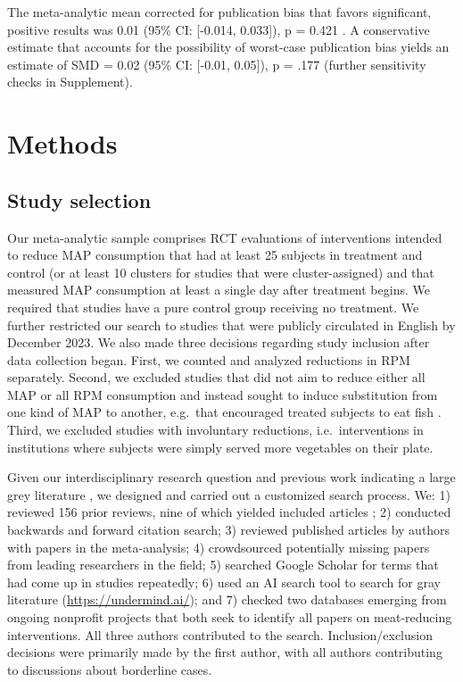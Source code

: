 \documentclass[sn-nature,referee,pdflatex]{sn-jnl}
\begin{document}
The meta-analytic mean corrected for publication bias that favors
significant, positive results was 0.01 (95\% CI: {[}-0.014, 0.033{]}), p
= 0.421 \citep{hedges1992}. A conservative estimate that accounts for
the possibility of worst-case publication bias yields an estimate of SMD
= 0.02 (95\% CI: {[}-0.01, 0.05{]}), p = .177
\citep{mathur2020, mathur2024} (further sensitivity checks in
Supplement).

\section{Methods}\label{sec3}

\subsection{Study selection}\label{sec3.1}

Our meta-analytic sample comprises RCT evaluations of interventions
intended to reduce MAP consumption that had at least 25 subjects in
treatment and control (or at least 10 clusters for studies that were
cluster-assigned) and that measured MAP consumption at least a single
day after treatment begins. We required that studies have a pure control
group receiving no treatment. We further restricted our search to
studies that were publicly circulated in English by December 2023. We
also made three decisions regarding study inclusion after data
collection began. First, we counted and analyzed reductions in RPM
separately. Second, we excluded studies that did not aim to reduce
either all MAP or all RPM consumption and instead sought to induce
substitution from one kind of MAP to another, e.g.~that encouraged
treated subjects to eat fish \citep{johansen2009}. Third, we excluded
studies with involuntary reductions, i.e.~interventions in institutions
where subjects were simply served more vegetables on their plate.

Given our interdisciplinary research question and previous work
indicating a large grey literature \citep{mathur2021meta}, we designed
and carried out a customized search process. We: 1) reviewed 156 prior
reviews, nine of which yielded included articles
\citep{mathur2021meta, bianchi2018conscious, bianchi2018restructuring, ammann2023, chang2023, DiGennaro2024, harguess2020, ronto2022, wynes2018};
2) conducted backwards and forward citation search; 3) reviewed
published articles by authors with papers in the meta-analysis; 4)
crowdsourced potentially missing papers from leading researchers in the
field; 5) searched Google Scholar for terms that had come up in studies
repeatedly; 6) used an AI search tool to search for gray literature
(\url{https://undermind.ai/}); and 7) checked two databases emerging
from ongoing nonprofit projects that both seek to identify all papers on
meat-reducing interventions. All three authors contributed to the
search. Inclusion/exclusion decisions were primarily made by the first
author, with all authors contributing to discussions about borderline
cases.
\end{document}

